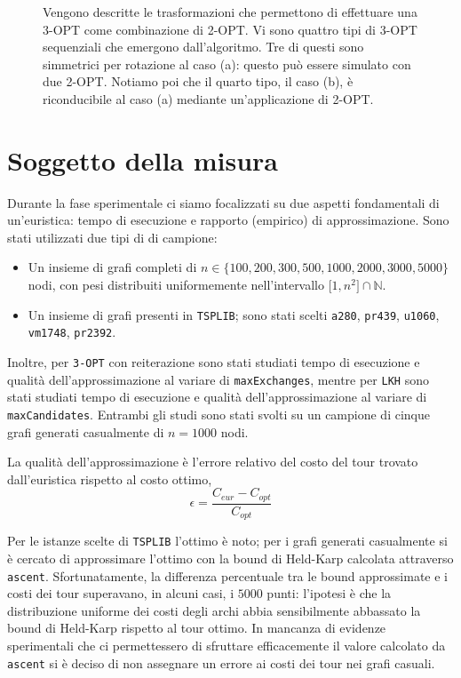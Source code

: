 \begin{figure}[H]
\begin{subfigure}{\linewidth}
        \caption{}
    \end{subfigure}
    \caption{Vengono descritte le trasformazioni che permettono di effettuare una 3-OPT come combinazione 
            di 2-OPT. Vi sono quattro tipi di 3-OPT sequenziali che emergono dall'algoritmo. Tre di 
            questi sono simmetrici per rotazione al caso (a): questo può essere simulato con due 2-OPT. 
            Notiamo poi che il quarto tipo, il caso (b), è riconducibile al caso (a) mediante un'applicazione di 2-OPT.}
\end{figure}

\section{Soggetto della misura}

Durante la fase sperimentale ci siamo focalizzati su due aspetti fondamentali di un'euristica: tempo di esecuzione 
e rapporto (empirico) di approssimazione. Sono stati utilizzati due tipi di di campione: 
\begin{itemize}
    \item Un insieme di grafi completi di $n \in \{100, 200, 300, 500, 1000, 2000, 3000, 5000\}$ nodi, con pesi 
            distribuiti uniformemente nell'intervallo $\big[1,n^2\big]\cap \mathbb{N}$.
    
    \item Un insieme di grafi presenti in \texttt{TSPLIB}; sono stati scelti \texttt{a280}, 
            \texttt{pr439}, \texttt{u1060}, \texttt{vm1748}, \texttt{pr2392}.
\end{itemize}

Inoltre, per \texttt{3-OPT} con reiterazione sono stati studiati tempo di esecuzione e qualità dell'approssimazione al variare 
di \texttt{maxExchanges}, mentre per \texttt{LKH} sono stati studiati tempo di esecuzione e qualità dell'approssimazione 
al variare di \texttt{maxCandidates}. Entrambi gli studi sono stati svolti su un campione di cinque grafi generati 
casualmente di $n=1000$ nodi.

La qualità dell'approssimazione è l'errore relativo del costo del tour trovato dall'euristica rispetto al costo ottimo,
$$\epsilon = \frac{C_{eur}-C_{opt}}{C_{opt}}$$

Per le istanze scelte di \texttt{TSPLIB} l'ottimo è noto; per i grafi generati casualmente si è cercato di approssimare 
l'ottimo con la bound di Held-Karp calcolata attraverso \texttt{ascent}. Sfortunatamente, la differenza percentuale tra 
le bound approssimate e i costi dei tour superavano, in alcuni casi, i $5000$ punti: l'ipotesi è che la distribuzione 
uniforme dei costi degli archi abbia sensibilmente abbassato la bound di Held-Karp rispetto al tour ottimo. In mancanza 
di evidenze sperimentali che ci permettessero di sfruttare efficacemente il valore calcolato da \texttt{ascent} si è 
deciso di non assegnare un errore ai costi dei tour nei grafi casuali.

